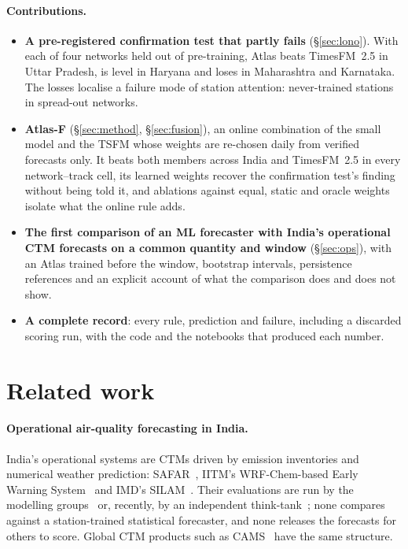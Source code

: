 \documentclass{article}
\begin{document}
\paragraph{Contributions.}
\begin{itemize}
\item \textbf{A pre-registered confirmation test that partly fails} (\S\ref{sec:lono}). With each of four networks
  held out of pre-training, Atlas beats TimesFM~2.5 in Uttar Pradesh, is level in Haryana and loses in Maharashtra and
  Karnataka. The losses localise a failure mode of station attention: never-trained stations in spread-out networks.
\item \textbf{Atlas-F} (\S\ref{sec:method}, \S\ref{sec:fusion}), an online combination of the small model and the TSFM
  whose weights are re-chosen daily from verified forecasts only. It beats both members across India and TimesFM~2.5 in
  every network--track cell, its learned weights recover the confirmation test's finding without being told it, and
  ablations against equal, static and oracle weights isolate what the online rule adds.
\item \textbf{The first comparison of an ML forecaster with India's operational CTM forecasts on a common quantity and
  window} (\S\ref{sec:ops}), with an Atlas trained before the window, bootstrap intervals, persistence references and an
  explicit account of what the comparison does and does not show.
\item \textbf{A complete record}: every rule, prediction and failure, including a discarded scoring run, with the code
  and the notebooks that produced each number.
\end{itemize}

\section{Related work}
\label{sec:related}

\paragraph{Operational air-quality forecasting in India.} India's operational systems are CTMs driven by emission
inventories and numerical weather prediction: SAFAR~\citep{beig2021safar}, IITM's WRF-Chem-based Early Warning
System~\citep{jena2021delhi400m} and IMD's SILAM~\citep{sofiev2015silam}. Their evaluations are run by the modelling
groups~\citep{jena2021delhi400m,sengupta2022delhi,yadav2025aqews} or, recently, by an independent
think-tank~\citep{ceew2025}; none compares against a station-trained statistical forecaster, and none releases the
forecasts for others to score. Global CTM products such as CAMS~\citep{inness2019cams} have the same structure.
\end{document}
